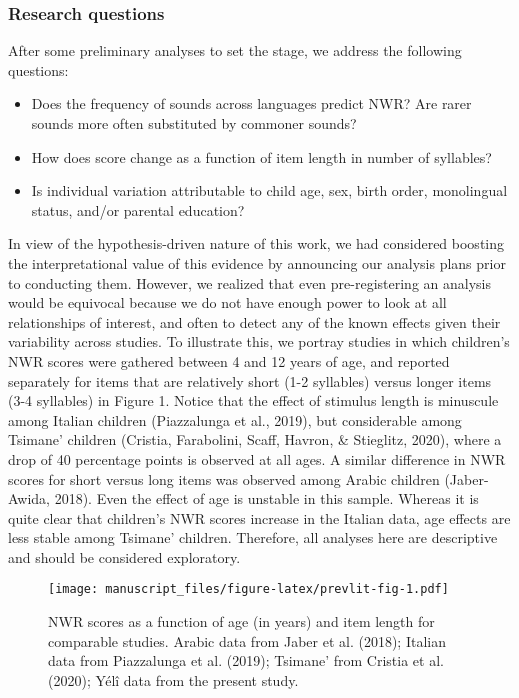 \documentclass[english,,man,floatsintext]{apa6}
\providecommand{\tightlist}{%
  \setlength{\itemsep}{0pt}\setlength{\parskip}{0pt}}
\begin{document}
\hypertarget{research-questions}{%
\subsubsection{Research questions}\label{research-questions}}

After some preliminary analyses to set the stage, we address the following questions:

\begin{itemize}
\tightlist
\item
  Does the frequency of sounds across languages predict NWR? Are rarer sounds more often substituted by commoner sounds?
\item
  How does score change as a function of item length in number of syllables?
\item
  Is individual variation attributable to child age, sex, birth order, monolingual status, and/or parental education?
\end{itemize}

In view of the hypothesis-driven nature of this work, we had considered boosting the interpretational value of this evidence by announcing our analysis plans prior to conducting them. However, we realized that even pre-registering an analysis would be equivocal because we do not have enough power to look at all relationships of interest, and often to detect any of the known effects given their variability across studies. To illustrate this, we portray studies in which children's NWR scores were gathered between 4 and 12 years of age, and reported separately for items that are relatively short (1-2 syllables) versus longer items (3-4 syllables) in Figure 1. Notice that the effect of stimulus length is minuscule among Italian children (Piazzalunga et al., 2019), but considerable among Tsimane' children (Cristia, Farabolini, Scaff, Havron, \& Stieglitz, 2020), where a drop of 40 percentage points is observed at all ages. A similar difference in NWR scores for short versus long items was observed among Arabic children (Jaber-Awida, 2018). Even the effect of age is unstable in this sample. Whereas it is quite clear that children's NWR scores increase in the Italian data, age effects are less stable among Tsimane' children. Therefore, all analyses here are descriptive and should be considered exploratory.

\begin{figure}
\centering
\texttt{[image: manuscript\_files/figure-latex/prevlit-fig-1.pdf]}
\caption{\label{fig:prevlit-fig}NWR scores as a function of age (in years) and item length for comparable studies. Arabic data from Jaber et al. (2018); Italian data from Piazzalunga et al. (2019); Tsimane' from Cristia et al. (2020); Yélî data from the present study.}
\end{figure}
\end{document}

